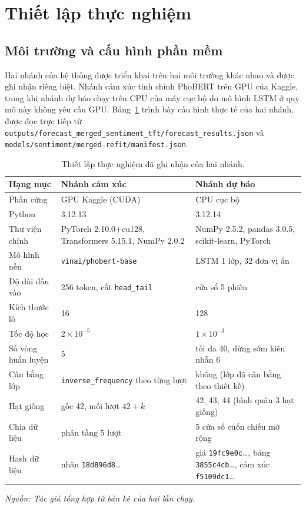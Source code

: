 \documentclass[12pt, a4paper, oneside]{report}
\begin{document}
\section{Thiết lập thực nghiệm}
\label{sec:kq-setup}

\subsection{Môi trường và cấu hình phần mềm}

Hai nhánh của hệ thống được triển khai trên hai môi trường khác nhau và được ghi nhận riêng biệt. Nhánh cảm xúc tinh chỉnh PhoBERT trên GPU của Kaggle, trong khi nhánh dự báo chạy trên CPU của máy cục bộ do mô hình LSTM ở quy mô này không yêu cầu GPU. Bảng~\ref{tab:kq-setup} trình bày cấu hình thực tế của hai nhánh, được đọc trực tiếp từ
\texttt{outputs/forecast\_merged\_sentiment\_tft/forecast\_results.json} và
\texttt{models/sentiment/merged-refit/manifest.json}.

\begin{table}[H]
  \centering
  \caption{Thiết lập thực nghiệm đã ghi nhận của hai nhánh.}
  \label{tab:kq-setup}
  \begin{tabular}{p{3.6cm} p{4.6cm} p{4.6cm}}
    \toprule
    Hạng mục & Nhánh cảm xúc & Nhánh dự báo \\
    \midrule
    Phần cứng & GPU Kaggle (CUDA) & CPU cục bộ \\
    Python & 3.12.13 & 3.12.14 \\
    Thư viện chính & PyTorch 2.10.0+cu128, Transformers 5.15.1, NumPy 2.0.2 & NumPy 2.5.2, pandas 3.0.5, scikit-learn, PyTorch \\
    Mô hình nền & \texttt{vinai/phobert-base} & LSTM 1 lớp, 32 đơn vị ẩn \\
    Độ dài đầu vào & 256 token, cắt \texttt{head\_tail} & cửa sổ 5 phiên \\
    Kích thước lô & 16 & 128 \\
    Tốc độ học & $2\times10^{-5}$ & $1\times10^{-3}$ \\
    Số vòng huấn luyện & 5 & tối đa 40, dừng sớm kiên nhẫn 6 \\
    Cân bằng lớp & \texttt{inverse\_frequency} theo từng lượt & không (lớp đã cân bằng theo thiết kế) \\
    Hạt giống & gốc 42, mỗi lượt $42+k$ & 42, 43, 44 (bình quân 3 hạt giống) \\
    Chia dữ liệu & phân tầng 5 lượt & 5 cửa sổ cuốn chiếu mở rộng \\
    Hash dữ liệu & nhãn \texttt{18d896d8}\ldots & giá \texttt{19fc9e0c}\ldots, bảng \texttt{3855c4cb}\ldots, cảm xúc \texttt{f5109dc1}\ldots \\
    \bottomrule
  \end{tabular}
\noindent\textit{Nguồn: Tác giả tổng hợp từ bản kê của hai lần chạy.}
\end{table}
\end{document}
